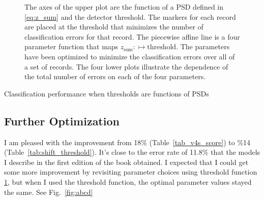 \documentclass[12pt]{article}
\begin{document}
\begin{figure}
  \centering
  \caption[A function of PSDs for varying detector thresholds.]{The
    axes of the upper plot are the function of a PSD defined in
    \eqref{eq:z_sum} and the detector threshold.  The markers for each
    record are placed at the threshold that minimizes the number of
    classification errors for that record.  The piecewise affine line
    is a four parameter function that maps
    $z_{\text{sum}}: \mapsto \text{threshold}$.  The parameters have
    been optimized to minimize the classification errors over all of a
    set of records.  The four lower plots illustrate the dependence of
    the total number of errors on each of the four parameters.  }
  \label{fig:shift_threshold}
\end{figure}

\begin{table*}
  \centering
  
  \caption[Performance]{Classification performance when thresholds are
  functions of PSDs}
  \label{tab:abcd_score}
\end{table*}

\clearpage

\subsection{Further Optimization}
\label{sec:further}

I am pleased with the improvement from 18\%
(Table~\ref{tab_v4s_score}) to \%14 (Table~\ref{tab:shift_threshold}).
It's close to the error rate of 11.8\% that the models I describe in
the first edition of the book obtained.  I expected that I could get
some more improvement by revisiting parameter choices using threshold
function \ref{fig:shift_threshold}, but when I used the threshold
function, the optimal parameter values stayed the same.  See
Fig.~\ref{fig:abcd}

\end{document}
